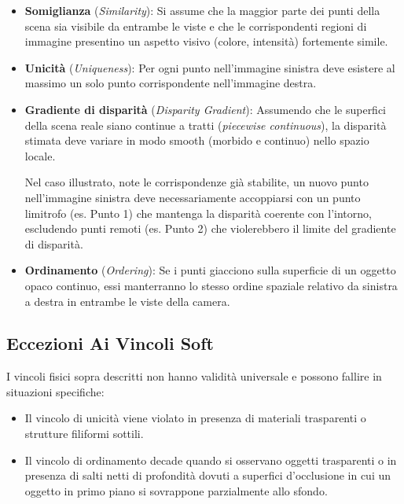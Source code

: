 ﻿\documentclass[11pt, a4paper]{article}
\begin{document}
\begin{itemize}
    \item \textbf{Somiglianza} (\emph{Similarity}): Si assume che la maggior parte dei punti della scena sia visibile da entrambe le viste e che le corrispondenti regioni di immagine presentino un aspetto visivo (colore, intensità) fortemente simile.
    \item \textbf{Unicità} (\emph{Uniqueness}): Per ogni punto nell'immagine sinistra deve esistere al massimo un solo punto corrispondente nell'immagine destra.


    \item \textbf{Gradiente di disparità} (\emph{Disparity Gradient}): Assumendo che le superfici della scena reale siano continue a tratti (\emph{piecewise continuous}), la disparità stimata deve variare in modo smooth (morbido e continuo) nello spazio locale.


    Nel caso illustrato, note le corrispondenze già stabilite, un nuovo punto nell'immagine sinistra deve necessariamente accoppiarsi con un punto limitrofo (es. Punto 1) che mantenga la disparità coerente con l'intorno, escludendo punti remoti (es. Punto 2) che violerebbero il limite del gradiente di disparità.

    \item \textbf{Ordinamento} (\emph{Ordering}): Se i punti giacciono sulla superficie di un oggetto opaco continuo, essi manterranno lo stesso ordine spaziale relativo da sinistra a destra in entrambe le viste della camera.

\end{itemize}

\subsection{Eccezioni Ai Vincoli Soft}

I vincoli fisici sopra descritti non hanno validità universale e possono fallire in situazioni specifiche:
\begin{itemize}
    \item Il vincolo di unicità viene violato in presenza di materiali trasparenti o strutture filiformi sottili.
    \item Il vincolo di ordinamento decade quando si osservano oggetti trasparenti o in presenza di salti netti di profondità dovuti a superfici d'occlusione in cui un oggetto in primo piano si sovrappone parzialmente allo sfondo.
\end{itemize}
\end{document}
